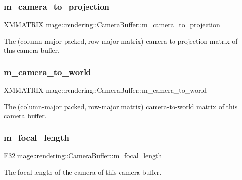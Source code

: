 \subsubsection{\texorpdfstring{m\+\_\+camera\+\_\+to\+\_\+projection}{m\_camera\_to\_projection}}
{\footnotesize\ttfamily X\+M\+M\+A\+T\+R\+IX mage\+::rendering\+::\+Camera\+Buffer\+::m\+\_\+camera\+\_\+to\+\_\+projection}

The (column-\/major packed, row-\/major matrix) camera-\/to-\/projection matrix of this camera buffer. \hypertarget{structmage_1_1rendering_1_1_camera_buffer_a0633cfc689f2a097783ecc1626b94590}{}\label{structmage_1_1rendering_1_1_camera_buffer_a0633cfc689f2a097783ecc1626b94590} 
\subsubsection{\texorpdfstring{m\+\_\+camera\+\_\+to\+\_\+world}{m\_camera\_to\_world}}
{\footnotesize\ttfamily X\+M\+M\+A\+T\+R\+IX mage\+::rendering\+::\+Camera\+Buffer\+::m\+\_\+camera\+\_\+to\+\_\+world}

The (column-\/major packed, row-\/major matrix) camera-\/to-\/world matrix of this camera buffer. \hypertarget{structmage_1_1rendering_1_1_camera_buffer_a7ed5079582d476597f8bc4d6a0b3f372}{}\label{structmage_1_1rendering_1_1_camera_buffer_a7ed5079582d476597f8bc4d6a0b3f372} 
\subsubsection{\texorpdfstring{m\+\_\+focal\+\_\+length}{m\_focal\_length}}
{\footnotesize\ttfamily \hyperlink{namespacemage_aa97e833b45f06d60a0a9c4fc22ae02c0}{F32} mage\+::rendering\+::\+Camera\+Buffer\+::m\+\_\+focal\+\_\+length}

The focal length of the camera of this camera buffer. \hypertarget{structmage_1_1rendering_1_1_camera_buffer_a6f963e7d607c59ab0dfc3972e06a9739}{}\label{structmage_1_1rendering_1_1_camera_buffer_a6f963e7d607c59ab0dfc3972e06a9739} 
